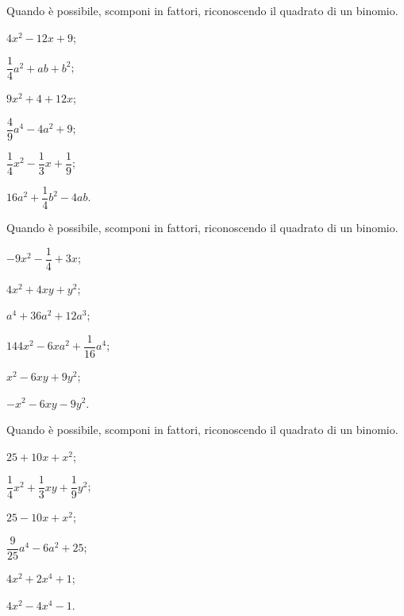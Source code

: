 \begin{esercizio}
\label{ese:13.24}
Quando è possibile, scomponi in fattori, riconoscendo il quadrato di un binomio.
\begin{multicols}{3}
\begin{enumeratea}
 \item $4x^{2}-12x+9$;
 \item $\dfrac{1}{4}a^{2}+ab+b^{2}$;
 \item $9x^{2}+4+12x$;
 \item $\dfrac{4}{9}a^{{4}}-4a^{2}+9$;
 \item $\dfrac{1}{4}x^{2}-\dfrac{1}{3}x+\dfrac{1}{9}$;
 \item $16a^{2}+\dfrac{1}{4}b^{2}-4ab$.
\end{enumeratea}
\end{multicols}
\end{esercizio}

\begin{esercizio}
\label{ese:13.25}
Quando è possibile, scomponi in fattori, riconoscendo il quadrato di un binomio.
\begin{multicols}{3}
\begin{enumeratea}
 \item $-9x^{2}-\dfrac{1}{4}+3x$;
 \item $4x^{2}+4xy+y^{2}$;
 \item $a^{4}+36a^{2}+12a^{3}$;
 \item $144x^{2}-6xa^{2}+\dfrac{1}{16}a^{4}$;
 \item $x^{2}-6xy+9y^{2}$;
 \item $-x^{2}-6xy-9y^{2}$.
\end{enumeratea}
\end{multicols}
\end{esercizio}

\begin{esercizio}
\label{ese:13.26}
Quando è possibile, scomponi in fattori, riconoscendo il quadrato di un binomio.
\begin{multicols}{3}
\begin{enumeratea}
 \item $25+10x+x^{2}$;
 \item $\dfrac{1}{4}x^{2}+\dfrac{1}{3}xy+\dfrac{1}{9}y^{2}$;
 \item $25-10x+x^{2}$;
 \item $\dfrac{9}{25}a^{4}-6a^{2}+25$;
 \item $4x^{2}+2x^{4}+1$;
 \item $4x^{2}-4x^{4}-1$.
\end{enumeratea}
\end{multicols}
\end{esercizio}

